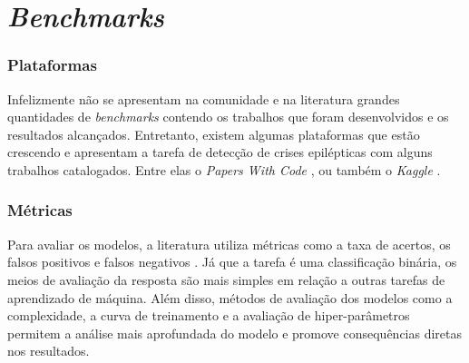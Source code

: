 \chapter{\textit{Benchmarks}}\label{chp:benchmk}

\subsection{Plataformas}

Infelizmente não se apresentam na comunidade e na literatura grandes quantidades de \textit{benchmarks} contendo os trabalhos que foram desenvolvidos e os resultados alcançados. Entretanto, existem algumas plataformas que estão crescendo e apresentam a tarefa de detecção de crises epilépticas com alguns trabalhos catalogados. Entre elas o \textit{Papers With Code} \cite{paperswithcode}, ou também o \textit{Kaggle} \cite{kaggle}. 

\subsection{Métricas}

Para avaliar os modelos, a literatura utiliza métricas como a taxa de acertos, os falsos positivos e falsos negativos \cite{godoyprediccao}. Já que a tarefa é uma classificação binária, os meios de avaliação da resposta são mais simples em relação a outras tarefas de aprendizado de máquina. Além disso, métodos de avaliação dos modelos como a complexidade, a curva de treinamento e a avaliação de hiper-parâmetros permitem a análise mais aprofundada do modelo e promove consequências diretas nos resultados.